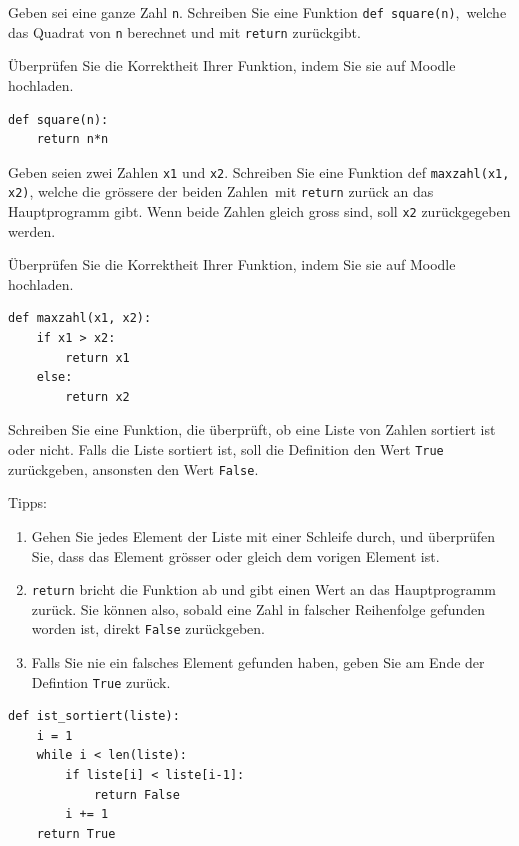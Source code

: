 \begin{mysubmission}
Geben sei eine ganze Zahl \texttt{n}. Schreiben Sie eine Funktion \lstinline|def square(n)|, welche das Quadrat von \lstinline|n| berechnet und mit \lstinline|return| zurückgibt.

Überprüfen Sie die Korrektheit Ihrer Funktion, indem Sie sie auf Moodle hochladen.
\begin{myanswer}
\begin{lstlisting}
def square(n):
    return n*n
\end{lstlisting}
\end{myanswer}
\end{mysubmission}

\begin{mysubmission}
Geben seien zwei Zahlen \lstinline|x1| und \lstinline|x2|. Schreiben Sie eine Funktion def \lstinline|maxzahl(x1, x2)|, welche die grössere der beiden Zahlen mit \lstinline|return| zurück an das Hauptprogramm gibt. Wenn beide Zahlen gleich gross sind, soll \lstinline|x2| zurückgegeben werden.

Überprüfen Sie die Korrektheit Ihrer Funktion, indem Sie sie auf Moodle hochladen.
\begin{myanswer}
\begin{lstlisting}
def maxzahl(x1, x2):
    if x1 > x2:
        return x1
    else: 
        return x2
\end{lstlisting}
\end{myanswer}
\end{mysubmission}

\begin{mysubmission}
Schreiben Sie eine Funktion, die überprüft, ob eine Liste von Zahlen sortiert ist oder nicht. Falls die Liste sortiert ist, soll die Definition den Wert \lstinline|True| zurückgeben, ansonsten den Wert \lstinline|False|.

Tipps:
\begin{enumerate}
\item Gehen Sie jedes Element der Liste mit einer Schleife durch, und überprüfen Sie, dass das Element grösser oder gleich dem vorigen Element ist.
\item \lstinline|return| bricht die Funktion ab und gibt einen Wert an das Hauptprogramm zurück. Sie können also, sobald eine Zahl in falscher Reihenfolge gefunden worden ist, direkt \lstinline|False| zurückgeben.
\item Falls Sie nie ein falsches Element gefunden haben, geben Sie am Ende der Defintion \lstinline|True| zurück.
\end{enumerate}
\begin{myanswer}
\begin{lstlisting}
def ist_sortiert(liste):
    i = 1
    while i < len(liste):
        if liste[i] < liste[i-1]:
            return False
        i += 1
    return True
\end{lstlisting}
\end{myanswer}
\end{mysubmission}

